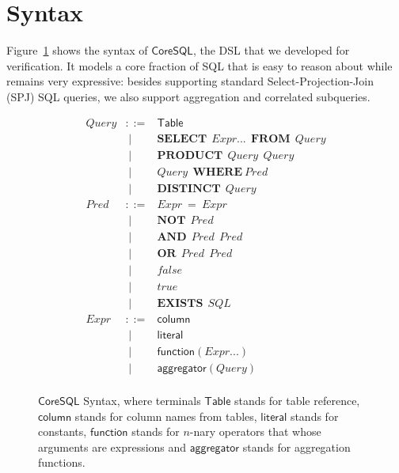 \section{Syntax}

Figure~\ref{tab:sql-syntax} shows the syntax of $\mathsf{CoreSQL}$, the DSL that we developed for verification. It models a core fraction of SQL that is easy to reason about while remains very expressive: besides supporting standard
Select-Projection-Join (SPJ) SQL queries, we also support aggregation and correlated subqueries.  

\begin{figure}[t]
\centering
\[
\begin{array}{rcl}
  \mathit{Query} & ::=  &  \mathsf{Table} \\
        & \; \mid & \mathbf{SELECT}~~\mathit{Expr}...~~\mathbf{FROM}~~\mathit{Query}      \\ 
        & \; \mid  & \mathbf{PRODUCT}~~\mathit{Query}~~\mathit{Query}        \\
        & \; \mid & \mathit{Query}~~\mathbf{WHERE}~\mathit{Pred}        \\
        & \; \mid & \mathbf{DISTINCT}~~\mathit{Query}                \\
  \mathit{Pred} & ::= & \mathit{Expr} ~ \mathbf{=}~\mathit{Expr} \\
       & \; \mid &  \mathbf{NOT} ~~ \mathit{Pred}      \\
       & \; \mid & \mathbf{AND} ~~ \mathit{Pred} ~~ \mathit{Pred}      \\ 
       & \; \mid & \mathbf{OR} ~~ \mathit{Pred} ~~ \mathit{Pred} \\
       & \; \mid & false \\
       & \; \mid & true  \\
       & \; \mid & \mathbf{EXISTS} ~~ SQL \\
  \mathit{Expr} & ::= & \mathsf{column}                     \\
        & \; \mid & \mathsf{literal}                  \\
        & \; \mid & \mathsf{function}(\mathit{Expr}...)     \\
        & \; \mid & \mathsf{aggregator}(\mathit{Query})  \\  
\end{array}
\]
\caption{$\mathsf{CoreSQL}$ Syntax, where terminals $\mathsf{Table}$ stands for table reference,  $\mathsf{column}$ stands for column names from tables, $\mathsf{literal}$ stands for constants, $\mathsf{function}$ stands for $n$-nary operators that whose arguments are expressions and $\mathsf{aggregator}$ stands for aggregation functions.}
\label{tab:sql-syntax}
\end{figure}

